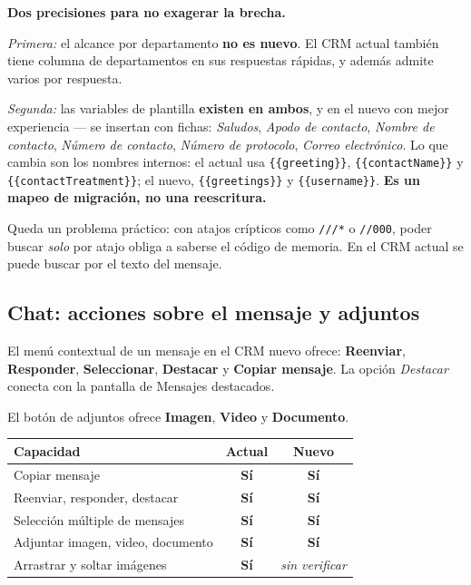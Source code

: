 \documentclass[11pt,a4paper]{article}
\newcommand{\cod}[1]{\texttt{\small #1}}
\newcommand{\si}{\textcolor{ok}{\textbf{Sí}}}
\newcommand{\vars}[1]{\cod{\{\{#1\}\}}}
\begin{document}
\begin{nota}
\textbf{Dos precisiones para no exagerar la brecha.}

\emph{Primera:} el alcance por departamento \textbf{no es nuevo}. El CRM actual también
tiene columna de departamentos en sus respuestas rápidas, y además admite varios por
respuesta.

\emph{Segunda:} las variables de plantilla \textbf{existen en ambos}, y en el nuevo con
mejor experiencia --- se insertan con fichas: \emph{Saludos}, \emph{Apodo de contacto},
\emph{Nombre de contacto}, \emph{Número de contacto}, \emph{Número de protocolo},
\emph{Correo electrónico}. Lo que cambia son los nombres internos: el actual usa
\vars{greeting}, \vars{contactName} y \vars{contactTreatment}; el nuevo, \vars{greetings}
y \vars{username}. \textbf{Es un mapeo de migración, no una reescritura.}
\end{nota}

Queda un problema práctico: con atajos crípticos como \cod{///*} o \cod{//000}, poder
buscar \emph{solo} por atajo obliga a saberse el código de memoria. En el CRM actual se
puede buscar por el texto del mensaje.

\subsection{Chat: acciones sobre el mensaje y adjuntos}

El menú contextual de un mensaje en el CRM nuevo ofrece: \textbf{Reenviar},
\textbf{Responder}, \textbf{Seleccionar}, \textbf{Destacar} y \textbf{Copiar mensaje}.
La opción \emph{Destacar} conecta con la pantalla de Mensajes destacados.

El botón de adjuntos ofrece \textbf{Imagen}, \textbf{Video} y \textbf{Documento}.

\begin{center}
\begin{tabularx}{\textwidth}{@{}Lcc@{}}
\toprule
\textbf{Capacidad} & \textbf{Actual} & \textbf{Nuevo} \\
\midrule
Copiar mensaje                 & \si & \si \\
Reenviar, responder, destacar  & \si & \si \\
Selección múltiple de mensajes & \si & \si \\
Adjuntar imagen, video, documento & \si & \si \\
Arrastrar y soltar imágenes    & \si & \textit{sin verificar} \\
\bottomrule
\end{tabularx}
\end{center}
\end{document}
